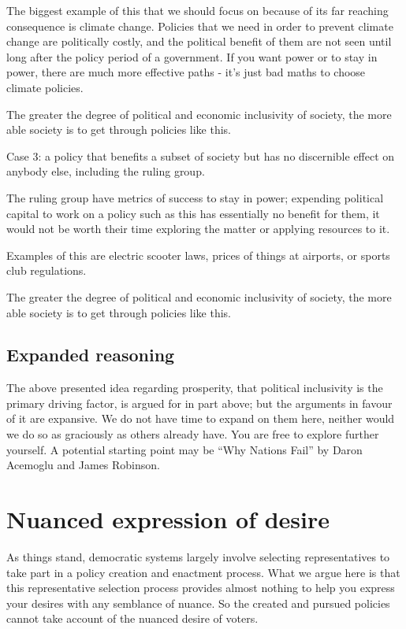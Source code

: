 \documentclass[twoside]{article}
\theoremstyle{definition}
\begin{document}
The biggest example of this that we should focus on because of its far reaching consequence is climate change. Policies that we need in order to prevent climate change are politically costly, and the political benefit of them are not seen until long after the policy period of a government. If you want power or to stay in power, there are much more effective paths - it’s just bad maths to choose climate policies.

The greater the degree of political and economic inclusivity of society, the more able society is to get through policies like this.

Case 3: a policy that benefits a subset of society but has no discernible effect on anybody else, including the ruling group.

The ruling group have metrics of success to stay in power; expending political capital to work on a policy such as this has essentially no benefit for them, it would not be worth their time exploring the matter or applying resources to it.

Examples of this are electric scooter laws, prices of things at airports, or sports club regulations.

The greater the degree of political and economic inclusivity of society, the more able society is to get through policies like this.

\subsection{Expanded reasoning}

The above presented idea regarding prosperity, that political inclusivity is the primary driving factor, is argued for in part above; but the arguments in favour of it are expansive. We do not have time to expand on them here, neither would we do so as graciously as others already have. You are free to explore further yourself. A potential starting point may be “Why Nations Fail” by Daron Acemoglu and James Robinson.

\section{Nuanced expression of desire}

As things stand, democratic systems largely involve selecting representatives to take part in a policy creation and enactment process. What we argue here is that this representative selection process provides almost nothing to help you express your desires with any semblance of nuance. So the created and pursued policies cannot take account of the nuanced desire of voters.
\end{document}
